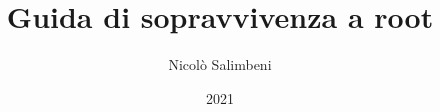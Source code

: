 \documentclass[a4paper,12pt]{book}
\begin{document}
\author{Nicolò Salimbeni}
\title{Guida di sopravvivenza a root}
\date{2021}

\mainmatter %
\maketitle  %
\tableofcontents  %






\end{document}
